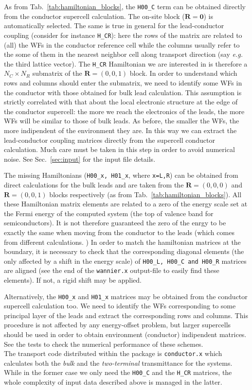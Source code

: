 As from Tab.~\ref{tab:hamiltonian_blocks}, the {\tt H00\_C} term can be obtained directly
from the conductor supercell calculation. The on-site block ($\mathbf{R}=\mathbf{0}$)
is automatically selected.
The same is true in general for the lead-conductor coupling (consider for instance
{\tt H\_CR}): here the rows of the matrix are related to (all) the WFs in the conductor
reference cell while the columns usually refer to the some 
of them in the nearest neighbor cell along transport direction (say {\it e.g.} the
third lattice vector). The {\tt H\_CR} Hamiltonian we are interested in is therefore a 
$N_C \times N_R$ submatrix of the $\mathbf{R}=(0,0,1)$ block.
In order to understand which rows and columns should enter the submatrix, 
we need to identify some WFs in the conductor with those obtained for bulk lead 
calculation. 
This assumption is strictly correlated with that about the local
electronic structure at the edge of the conductor supercell: the more we reach
the electronics of the leads, the more WFs will be similar to those of bulk leads.
As before, the smaller the WFs, the more indipendent of the environment they are.
In this way we can extract the lead-conductor coupling matrices
directly from the supercell conductor calculation. Much care must be 
taken in this step in order to avoid numerical noise. 
See Sec.~\ref{sec:input} for the input file details.

The missing Hamiltonians ({\tt H00\_x, H01\_x}, where {\tt x=L,R}) can be obtained from
direct calculations for the bulk leads and are taken from the 
$\mathbf{R}=(0,0,0)$ and $\mathbf{R}=(0,0,1)$ blocks respectively 
(as from Tab.~\ref{tab:hamiltonian_blocks}).
All these Hamiltonian matrix elements are related to a zero of the energy scale 
set at the Fermi energy of the computed system 
(the top of valence band for semiconductors). It is not therefore guaranteed the
zero of the enrgy to be exactly the same when moving from the conductor to the leads
(which comes from different calculations. )
In order to
match the hamiltonian matrices at the boundary, it is necessary to
check that the corresponding diagonal elements (the only affected by a shift in the
energy scale) 
of {\tt H00\_L, H00\_C and H00\_R} matrices are aligned 
(see the end of the {\tt wannier.x} output-file to 
easily find these elements). If not, a rigid shift may be applied.

Alternatively, the {\tt H00\_x} and {\tt H01\_x} matrices may be obtained from the 
conductor supercell calculation too.
We need to identify the WFs corresponding to some principal layer of the leads
and extract the corresponding rows and columns. This procedure is not affected by
any energy-offset problem, but larger supercells should be used in order to obtain
environment (conductor) indipendent matrices. See the tests to check the 
numerical performance of these schemes.
%
\\

\noindent The transport code distributed within the \WANT package is 
{\tt conductor.x} which calculates both the 
{\em bulk} and the {\em two-terminal} transmittance for the systems.
While in the former case we 
only need the {\tt H00\_C} and the {\tt H\_CR} matrices, the whole complexity
of input data described above is managed in the latter.

